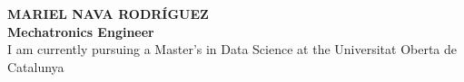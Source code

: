 \documentclass[11pt,a4paper]{article}
\begin{document}

\begin{center}
    \color{white} %
    {\LARGE\bfseries MARIEL NAVA RODRÍGUEZ} \\
    \vspace{0.2em}
    \textbf{Mechatronics Engineer} \\
    \vspace{0.2em}
    \small I am currently pursuing a Master's in Data Science at the Universitat Oberta de Catalunya
\end{center}

\vspace{2em}
\end{document}
